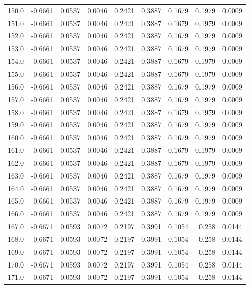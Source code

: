 \begin{longtable}{lrrrrrrrr}
150.0 & -0.6661 & 0.0537 & 0.0046 & 0.2421 & 0.3887 & 0.1679 & 0.1979 & 0.0009 \\
151.0 & -0.6661 & 0.0537 & 0.0046 & 0.2421 & 0.3887 & 0.1679 & 0.1979 & 0.0009 \\
152.0 & -0.6661 & 0.0537 & 0.0046 & 0.2421 & 0.3887 & 0.1679 & 0.1979 & 0.0009 \\
153.0 & -0.6661 & 0.0537 & 0.0046 & 0.2421 & 0.3887 & 0.1679 & 0.1979 & 0.0009 \\
154.0 & -0.6661 & 0.0537 & 0.0046 & 0.2421 & 0.3887 & 0.1679 & 0.1979 & 0.0009 \\
155.0 & -0.6661 & 0.0537 & 0.0046 & 0.2421 & 0.3887 & 0.1679 & 0.1979 & 0.0009 \\
156.0 & -0.6661 & 0.0537 & 0.0046 & 0.2421 & 0.3887 & 0.1679 & 0.1979 & 0.0009 \\
157.0 & -0.6661 & 0.0537 & 0.0046 & 0.2421 & 0.3887 & 0.1679 & 0.1979 & 0.0009 \\
158.0 & -0.6661 & 0.0537 & 0.0046 & 0.2421 & 0.3887 & 0.1679 & 0.1979 & 0.0009 \\
159.0 & -0.6661 & 0.0537 & 0.0046 & 0.2421 & 0.3887 & 0.1679 & 0.1979 & 0.0009 \\
160.0 & -0.6661 & 0.0537 & 0.0046 & 0.2421 & 0.3887 & 0.1679 & 0.1979 & 0.0009 \\
161.0 & -0.6661 & 0.0537 & 0.0046 & 0.2421 & 0.3887 & 0.1679 & 0.1979 & 0.0009 \\
162.0 & -0.6661 & 0.0537 & 0.0046 & 0.2421 & 0.3887 & 0.1679 & 0.1979 & 0.0009 \\
163.0 & -0.6661 & 0.0537 & 0.0046 & 0.2421 & 0.3887 & 0.1679 & 0.1979 & 0.0009 \\
164.0 & -0.6661 & 0.0537 & 0.0046 & 0.2421 & 0.3887 & 0.1679 & 0.1979 & 0.0009 \\
165.0 & -0.6661 & 0.0537 & 0.0046 & 0.2421 & 0.3887 & 0.1679 & 0.1979 & 0.0009 \\
166.0 & -0.6661 & 0.0537 & 0.0046 & 0.2421 & 0.3887 & 0.1679 & 0.1979 & 0.0009 \\
167.0 & -0.6671 & 0.0593 & 0.0072 & 0.2197 & 0.3991 & 0.1054 & 0.258 & 0.0144 \\
168.0 & -0.6671 & 0.0593 & 0.0072 & 0.2197 & 0.3991 & 0.1054 & 0.258 & 0.0144 \\
169.0 & -0.6671 & 0.0593 & 0.0072 & 0.2197 & 0.3991 & 0.1054 & 0.258 & 0.0144 \\
170.0 & -0.6671 & 0.0593 & 0.0072 & 0.2197 & 0.3991 & 0.1054 & 0.258 & 0.0144 \\
171.0 & -0.6671 & 0.0593 & 0.0072 & 0.2197 & 0.3991 & 0.1054 & 0.258 & 0.0144 \\

\end{longtable}
